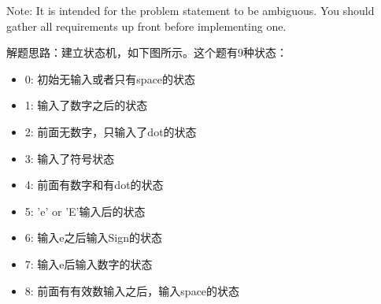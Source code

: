 \documentclass[a4paper,10pt]{article}
\begin{document}
\noindent Note: It is intended for the problem statement to be ambiguous. You should gather all requirements up front before implementing one.

\begin{CJK*}{UTF8}{gbsn}
\noindent 解题思路：建立状态机，如下图所示。这个题有9种状态：
\begin{itemize}
    \item 0: 初始无输入或者只有space的状态
    \item 1: 输入了数字之后的状态
    \item 2: 前面无数字，只输入了dot的状态
    \item 3: 输入了符号状态
    \item 4: 前面有数字和有dot的状态
    \item 5: 'e' or 'E'输入后的状态
    \item 6: 输入e之后输入Sign的状态
    \item 7: 输入e后输入数字的状态
    \item 8: 前面有有效数输入之后，输入space的状态
\end{itemize}
\end{CJK*}
\end{document}
